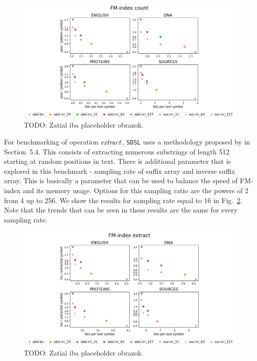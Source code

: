 \begin{figure}
	\centerline{
		\includegraphics[width=\textwidth, height=0.35\textheight]{images/vysledky_sdsl_count}
	}
	\caption[TODO]{TODO: Zatial iba placeholder obrazok.
	}
	\label{obr:benchmark_sdsl_count}
\end{figure}

For benchmarking of operation $\mathit{extract}$, \texttt{SDSL} uses a methodology proposed by
\cite{ferragina2009compressed} in Section~5.4. This consists of extracting numerous
substrings of length 512 starting at random positions in text. There is additional parameter
that is explored in this benchmark - sampling rate of suffix array and inverse suffix array.
This is basically a parameter that can be used to balance the speed of FM-index and its memory
usage. Options for this sampling ratio are the powers of 2 from 4 up to 256. We show the
results for sampling rate equal to 16 in Fig.~\ref{obr:benchmark_sdsl_extract}. Note that the
trends that can be seen in these results are the same for every sampling rate.

\begin{figure}
	\centerline{
		\includegraphics[width=\textwidth, height=0.35\textheight]{images/vysledky_sdsl_extract}
	}
	\caption[TODO]{TODO: Zatial iba placeholder obrazok.
	}
	\label{obr:benchmark_sdsl_extract}
\end{figure}

